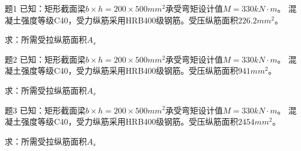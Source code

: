 
\begin{frame}[plain]{ 题1 } \vspace{-0.1em}
	已知：矩形截面梁$b\times h=200\times 500mm^2$承受弯矩设计值$M=330kN\cdot m$。
	混凝土强度等级C40，受力纵筋采用HRB400级钢筋。受压纵筋面积$226.2mm^2$。

	求：所需受拉纵筋面积$A_s$
\end{frame}


\begin{frame}[plain]{ 题2 } \vspace{-0.1em}
	已知：矩形截面梁$b\times h=200\times 500mm^2$承受弯矩设计值$M=330kN\cdot m$。
	混凝土强度等级C40，受力纵筋采用HRB400级钢筋。受压纵筋面积$941mm^2$。

	求：所需受拉纵筋面积$A_s$
\end{frame}


\begin{frame}[plain]{ 题3 } \vspace{-0.1em}
	已知：矩形截面梁$b\times h=200\times 500mm^2$承受弯矩设计值$M=330kN\cdot m$。
	混凝土强度等级C40，受力纵筋采用HRB400级钢筋。受压纵筋面积$2454mm^2$。

	求：所需受拉纵筋面积$A_s$
\end{frame}

% 